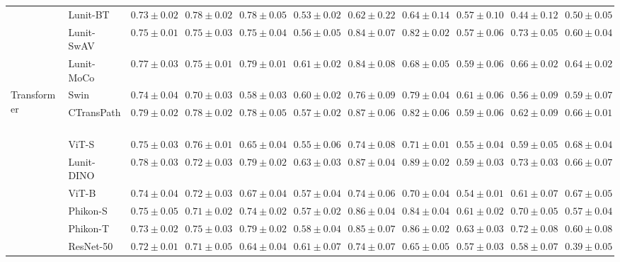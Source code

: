 \begin{tabular}{ll|cccc|c|cccc}
 & Lunit-BT~\cite{kang2023benchmarking} & $0.73 \pm 0.02$ & $0.78 \pm 0.02$ & $0.78 \pm 0.05$ & $0.53 \pm 0.02$ & $0.62 \pm 0.22$ & $0.64 \pm 0.14$ & $0.57 \pm 0.10$ & $0.44 \pm 0.12$ & $0.50 \pm 0.05$ \\
 & Lunit-SwAV~\cite{kang2023benchmarking} & $0.75 \pm 0.01$ & $0.75 \pm 0.03$ & $0.75 \pm 0.04$ & $0.56 \pm 0.05$ & $0.84 \pm 0.07$ & $0.82 \pm 0.02$ & $0.57 \pm 0.06$ & $0.73 \pm 0.05$ & $0.60 \pm 0.04$ \\
 & Lunit-MoCo~\cite{kang2023benchmarking} & $0.77 \pm 0.03$ & $0.75 \pm 0.01$ & $0.79 \pm 0.01$ & $0.61 \pm 0.02$ & $0.84 \pm 0.08$ & $0.68 \pm 0.05$ & $0.59 \pm 0.06$ & $0.66 \pm 0.02$ & $0.64 \pm 0.02$ \\
\cline{1-11}
\multirow[t]{12}{*}{Transformer} & Swin~\cite{liu2021swin} & $0.74 \pm 0.04$ & $0.70 \pm 0.03$ & $0.58 \pm 0.03$ & $0.60 \pm 0.02$ & $0.76 \pm 0.09$ & $0.79 \pm 0.04$ & $0.61 \pm 0.06$ & $0.56 \pm 0.09$ & $0.59 \pm 0.07$ \\
 & CTransPath~\cite{wang2022transformer} & $\mathbf{0.79 \pm 0.02}$ & $\mathbf{0.78 \pm 0.02}$ & $0.78 \pm 0.05$ & $0.57 \pm 0.02$ & $0.87 \pm 0.06$ & $0.82 \pm 0.06$ & $0.59 \pm 0.06$ & $0.62 \pm 0.09$ & $0.66 \pm 0.01$ \\
 & ViT-S~\cite{kolesnikov2021image} & $0.75 \pm 0.03$ & $0.76 \pm 0.01$ & $0.65 \pm 0.04$ & $0.55 \pm 0.06$ & $0.74 \pm 0.08$ & $0.71 \pm 0.01$ & $0.55 \pm 0.04$ & $0.59 \pm 0.05$ & $\mathbf{0.68 \pm 0.04}$ \\
 & Lunit-DINO~\cite{kang2023benchmarking} & $0.78 \pm 0.03$ & $0.72 \pm 0.03$ & $0.79 \pm 0.02$ & $\mathbf{0.63 \pm 0.03}$ & $\mathbf{0.87 \pm 0.04}$ & $\mathbf{0.89 \pm 0.02}$ & $0.59 \pm 0.03$ & $\mathbf{0.73 \pm 0.03}$ & $0.66 \pm 0.07$ \\
 & ViT-B~\cite{kolesnikov2021image} & $0.74 \pm 0.04$ & $0.72 \pm 0.03$ & $0.67 \pm 0.04$ & $0.57 \pm 0.04$ & $0.74 \pm 0.06$ & $0.70 \pm 0.04$ & $0.54 \pm 0.01$ & $0.61 \pm 0.07$ & $0.67 \pm 0.05$ \\
 & Phikon-S~\cite{filiot2023scaling} & $0.75 \pm 0.05$ & $0.71 \pm 0.02$ & $0.74 \pm 0.02$ & $0.57 \pm 0.02$ & $0.86 \pm 0.04$ & $0.84 \pm 0.04$ & $0.61 \pm 0.02$ & $0.70 \pm 0.05$ & $0.57 \pm 0.04$ \\
 & Phikon-T~\cite{filiot2023scaling} & $0.73 \pm 0.02$ & $0.75 \pm 0.03$ & $0.79 \pm 0.02$ & $0.58 \pm 0.04$ & $0.85 \pm 0.07$ & $0.86 \pm 0.02$ & $0.63 \pm 0.03$ & $0.72 \pm 0.08$ & $0.60 \pm 0.08$ \\
 & ResNet-50~\cite{he2015deep} & $0.72 \pm 0.01$ & $0.71 \pm 0.05$ & $0.64 \pm 0.04$ & $0.61 \pm 0.07$ & $0.74 \pm 0.07$ & $0.65 \pm 0.05$ & $0.57 \pm 0.03$ & $0.58 \pm 0.07$ & $0.39 \pm 0.05$ \\

\end{tabular}
